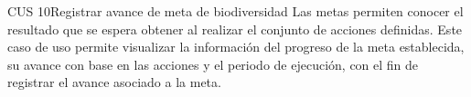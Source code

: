 
\begin{UseCase}{CUS 10}{Registrar avance de meta de biodiversidad}
{
    Las metas permiten conocer el resultado que se espera obtener al realizar el conjunto de acciones definidas. Este caso de uso permite visualizar la información del progreso de la meta establecida, su avance con base en las acciones y el periodo de ejecución, con el fin de registrar el avance asociado a la meta.
}
    

    


\end{UseCase}
